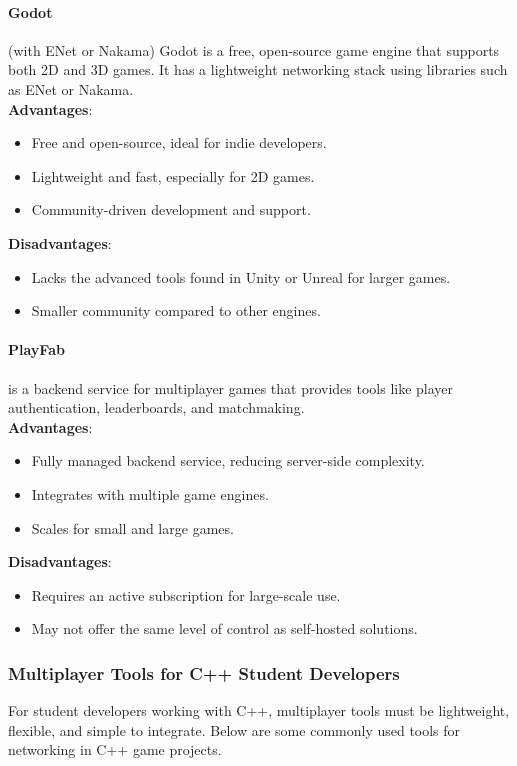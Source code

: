 \documentclass{article} %
\begin{document}
\paragraph{Godot} (with ENet or Nakama) Godot is a free,
open-source game engine that supports both 2D and 3D games.
It has a lightweight networking stack using libraries such as ENet or Nakama.
\\
\textbf{Advantages}:
\begin{itemize}
    \item Free and open-source, ideal for indie developers.
    \item Lightweight and fast, especially for 2D games.
    \item Community-driven development and support.
\end{itemize}
\textbf{Disadvantages}:
\begin{itemize}
    \item Lacks the advanced tools found in Unity or Unreal for larger games.
    \item Smaller community compared to other engines.
\end{itemize}

\paragraph{PlayFab} is a backend service for multiplayer games that provides tools like player authentication, leaderboards, and matchmaking.
\\
\textbf{Advantages}:
\begin{itemize}
    \item Fully managed backend service, reducing server-side complexity.
    \item Integrates with multiple game engines.
    \item Scales for small and large games.
\end{itemize}
\textbf{Disadvantages}:
\begin{itemize}
    \item Requires an active subscription for large-scale use.
    \item May not offer the same level of control as self-hosted solutions.
\end{itemize}

\subsubsection{Multiplayer Tools for C++ Student Developers}
For student developers working with C++,
multiplayer tools must be lightweight, flexible, and simple to integrate.
Below are some commonly used tools for networking in C++ game projects.
\end{document}
